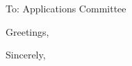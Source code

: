 \documentclass[11pt]{letter}
\begin{document}
\pagestyle{empty}
 
\begin{letter}{To: Applications Committee}

    \opening{Greetings,}

    \Blindtext

    \closing{Sincerely,\\
     \\
    }
\end{letter}
 
\end{document}
